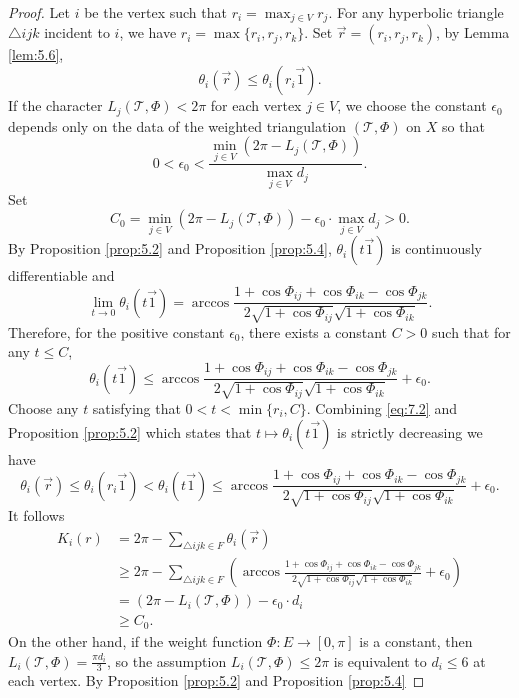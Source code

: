 \documentclass[12pt]{amsart}
\numberwithin{equation}{section}
\begin{document}
\begin{proof}
Let $i$ be the vertex such that $r_i = \max_{j \in V} r_j$. For any hyperbolic triangle $\triangle ijk$ incident to $i$, we have
$r_i = \max\{r_i, r_j, r_k\}$. Set $\vec{r} = (r_i, r_j, r_k)$, by Lemma \ref{lem:5.6},
\begin{equation}\label{eq:7.2}
\theta_i(\vec{r}) \leq \theta_i(r_i\vec{1}).
\end{equation}
If the character $L_j(\mathcal{T},\Phi) < 2\pi$ for each vertex $j \in V$, we choose the constant $\epsilon_0$ depends only on the
data of the weighted triangulation $(\mathcal{T},\Phi)$ on $X$ so that
\[
0 < \epsilon_0 < \frac{\min_{j \in V}(2\pi - L_j(\mathcal{T},\Phi))}{\max_{j \in V} d_j}.
\]
Set
\[
C_0 = \min_{j \in V}(2\pi - L_j(\mathcal{T},\Phi)) - \epsilon_0 \cdot \max_{j \in V} d_j > 0.
\]
By Proposition \ref{prop:5.2} and Proposition \ref{prop:5.4}, $\theta_i(t\vec{1})$ is continuously differentiable and
\[
\lim_{t \to 0} \theta_i(t\vec{1}) = \arccos \frac{1 + \cos\Phi_{ij} + \cos\Phi_{ik} - \cos\Phi_{jk}}{2\sqrt{1 + \cos\Phi_{ij}}\sqrt{1 + \cos\Phi_{ik}}}.
\]
Therefore, for the positive constant $\epsilon_0$, there exists a constant $C > 0$ such that for any $t \leq C$,
\[
\theta_i(t\vec{1}) \leq \arccos \frac{1 + \cos\Phi_{ij} + \cos\Phi_{ik} - \cos\Phi_{jk}}{2\sqrt{1 + \cos\Phi_{ij}}\sqrt{1 + \cos\Phi_{ik}}} + \epsilon_0.
\]
Choose any $t$ satisfying that $0 < t < \min\{r_i, C\}$. Combining \eqref{eq:7.2} and Proposition \ref{prop:5.2} which states
that $t \mapsto \theta_i(t\vec{1})$ is strictly decreasing we have
\begin{equation}\label{eq:7.3}
\theta_i(\vec{r}) \leq \theta_i(r_i\vec{1}) < \theta_i(t\vec{1}) \leq \arccos \frac{1 + \cos\Phi_{ij} + \cos\Phi_{ik} - \cos\Phi_{jk}}{2\sqrt{1 + \cos\Phi_{ij}}\sqrt{1 + \cos\Phi_{ik}}} + \epsilon_0.
\end{equation}
It follows
\begin{align*}
K_i(r) &= 2\pi - \sum_{\triangle ijk \in F} \theta_i(\vec{r}) \\
&\geq 2\pi - \sum_{\triangle ijk \in F} \left(\arccos \frac{1 + \cos\Phi_{ij} + \cos\Phi_{ik} - \cos\Phi_{jk}}{2\sqrt{1 + \cos\Phi_{ij}}\sqrt{1 + \cos\Phi_{ik}}} + \epsilon_0\right) \\
&= (2\pi - L_i(\mathcal{T},\Phi)) - \epsilon_0 \cdot d_i \\
&\geq C_0.
\end{align*}
On the other hand, if the weight function $\Phi : E \to [0,\pi]$ is a constant, then $L_i(\mathcal{T},\Phi) = \frac{\pi d_i}{3}$, so the
assumption $L_i(\mathcal{T},\Phi) \leq 2\pi$ is equivalent to $d_i \leq 6$ at each vertex. By Proposition \ref{prop:5.2} and Proposition \ref{prop:5.4}

\end{proof}
\end{document}
